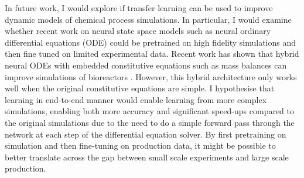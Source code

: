 In future work, I would explore if transfer learning can be used to improve dynamic models of chemical process simulations. In particular, I would examine whether recent work on neural state space models such as neural ordinary differential equations (ODE) \cite{Chen2018} could be pretrained on high fidelity simulations and then fine tuned on limited experimental data. Recent work has shown that hybrid neural ODEs with embedded constitutive equations such as mass balances can improve simulations of bioreactors \cite{Bangi2022}. However, this hybrid architecture only works well when the original constitutive equations are simple. I hypothesise that learning in end-to-end manner would enable learning from more complex simulations, enabling both more accuracy and significant speed-ups compared to the original simulations due to the need to do a simple forward pass through the network at each step of the differential equation solver. By first pretraining on simulation and then fine-tuning on production data, it might be possible to better translate across the gap between small scale experiments and large scale production.





